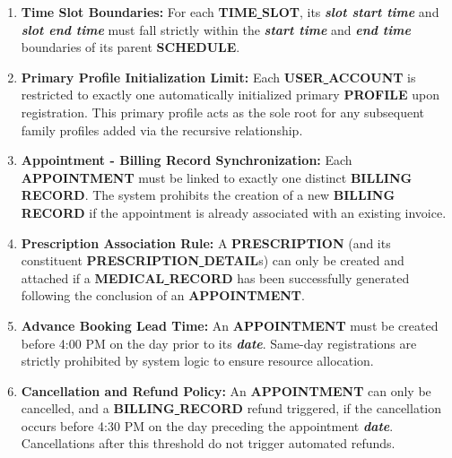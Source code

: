\begin{sloppypar}
\begin{enumerate}
    \item \textbf{Time Slot Boundaries:} 
    For each \textbf{TIME\uline{ }SLOT}, its \textbf{\textit{slot start time}} and \textbf{\textit{slot end time}} must fall strictly within the \textbf{\textit{start time}} and \textbf{\textit{end time}} boundaries of its parent \textbf{SCHEDULE}.

    \item \textbf{Primary Profile Initialization Limit:} 
    Each \textbf{USER\uline{ }ACCOUNT} is restricted to exactly one automatically initialized primary \textbf{PROFILE} upon registration. This primary profile acts as the sole root for any subsequent family profiles added via the recursive relationship.

    \item \textbf{Appointment - Billing Record Synchronization:} 
    Each \textbf{APPOINTMENT} must be linked to exactly one distinct \textbf{BILLING\uline{ }RECORD}. The system prohibits the creation of a new \textbf{BILLING\uline{ }RECORD} if the appointment is already associated with an existing invoice.

    \item \textbf{Prescription Association Rule:} 
    A \textbf{PRESCRIPTION} (and its constituent \textbf{PRESCRIPTION\uline{ }DETAIL}s) can only be created and attached if a \textbf{MEDICAL\uline{ }RECORD} has been successfully generated following the conclusion of an \textbf{APPOINTMENT}.

    \item \textbf{Advance Booking Lead Time:} 
    An \textbf{APPOINTMENT} must be created before 4:00 PM on the day prior to its \textbf{\textit{date}}. Same-day registrations are strictly prohibited by system logic to ensure resource allocation.

    \item \textbf{Cancellation and Refund Policy:} 
    An \textbf{APPOINTMENT} can only be cancelled, and a \textbf{BILLING\uline{ }RECORD} refund triggered, if the cancellation occurs before 4:30 PM on the day preceding the appointment \textbf{\textit{date}}. Cancellations after this threshold do not trigger automated refunds.
\end{enumerate}    
\end{sloppypar}